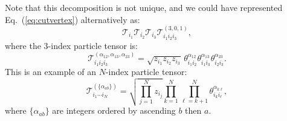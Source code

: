 \documentclass[aps,prd,floatfix,preprintnumbers,twocolumn,groupedaddress,nofootinbib,longbibliography,10pt]{revtex4-1}
\DeclareRobustCommand{\Eq}[1]{Eq.~(\ref{#1})}
\begin{document}
Note that this decomposition is not unique, and we could have represented \Eq{eq:cutvertex} alternatively as:
%
\begin{equation}
\label{eq:cutvertex_alt}
\mathcal{T}_{i_1} \mathcal{T}_{i_2} \mathcal{T}_{i_3} \mathcal{T}^{(3,0,1)}_{i_1 i_2 i_3},
\end{equation}
%
where the 3-index particle tensor is:
%
\begin{equation}
\mathcal{T}^{(\alpha_{12},\alpha_{13},\alpha_{23})}_{i_1i_2i_3} = \sqrt{z_{i_1}z_{i_2} z_{i_3}} \, \theta^{\alpha_{12}}_{i_1 i_2} \theta^{\alpha_{13}}_{i_1 i_3} \theta^{\alpha_{23}}_{i_2 i_3}.
\end{equation}
%
This is an example of an $N$-index particle tensor:
%
\begin{equation}
\label{eq:generalNindex}
\mathcal{T}_{i_1\cdots i_N}^{(\{\alpha_{ab}\})} = \sqrt{\prod_{j=1}^N z_{i_j}} \prod_{k=1}^N\prod_{\ell=k+1}^N\theta_{i_k i_\ell}^{\alpha_{k\ell}},
\end{equation}
%
where $\{\alpha_{ab}\}$ are integers ordered by ascending $b$ then $a$.
\end{document}
